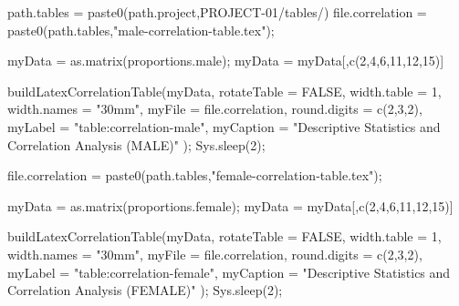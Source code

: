 \documentclass[]{article}
\newenvironment{Shaded}{\begin{snugshade}}{\end{snugshade}}
\newcommand{\AttributeTok}[1]{\textcolor[rgb]{0.77,0.63,0.00}{#1}}
\newcommand{\ConstantTok}[1]{\textcolor[rgb]{0.00,0.00,0.00}{#1}}
\newcommand{\DecValTok}[1]{\textcolor[rgb]{0.00,0.00,0.81}{#1}}
\newcommand{\FunctionTok}[1]{\textcolor[rgb]{0.00,0.00,0.00}{#1}}
\newcommand{\NormalTok}[1]{#1}
\newcommand{\OtherTok}[1]{\textcolor[rgb]{0.56,0.35,0.01}{#1}}
\newcommand{\StringTok}[1]{\textcolor[rgb]{0.31,0.60,0.02}{#1}}
\begin{document}
\begin{Shaded}
\begin{Highlighting}[]
\NormalTok{path.tables }\OtherTok{=} \FunctionTok{paste0}\NormalTok{(path.project,}\StringTok{\textquotesingle{}PROJECT{-}01/tables/\textquotesingle{}}\NormalTok{)}
\NormalTok{file.correlation }\OtherTok{=} \FunctionTok{paste0}\NormalTok{(path.tables,}\StringTok{"male{-}correlation{-}table.tex"}\NormalTok{);}

\NormalTok{myData }\OtherTok{=} \FunctionTok{as.matrix}\NormalTok{(proportions.male);}
\NormalTok{myData }\OtherTok{=}\NormalTok{ myData[,}\FunctionTok{c}\NormalTok{(}\DecValTok{2}\NormalTok{,}\DecValTok{4}\NormalTok{,}\DecValTok{6}\NormalTok{,}\DecValTok{11}\NormalTok{,}\DecValTok{12}\NormalTok{,}\DecValTok{15}\NormalTok{)]}

\FunctionTok{buildLatexCorrelationTable}\NormalTok{(myData, }
  \AttributeTok{rotateTable =} \ConstantTok{FALSE}\NormalTok{,}
  \AttributeTok{width.table =} \DecValTok{1}\NormalTok{,}
  \AttributeTok{width.names =} \StringTok{"30mm"}\NormalTok{,}
  \AttributeTok{myFile =}\NormalTok{ file.correlation,}
  \AttributeTok{round.digits =} \FunctionTok{c}\NormalTok{(}\DecValTok{2}\NormalTok{,}\DecValTok{3}\NormalTok{,}\DecValTok{2}\NormalTok{),}
  \AttributeTok{myLabel =} \StringTok{"table:correlation{-}male"}\NormalTok{,}
  \AttributeTok{myCaption =} \StringTok{"Descriptive Statistics and Correlation Analysis (MALE)"}
\NormalTok{  );}
\FunctionTok{Sys.sleep}\NormalTok{(}\DecValTok{2}\NormalTok{);}

\NormalTok{file.correlation }\OtherTok{=} \FunctionTok{paste0}\NormalTok{(path.tables,}\StringTok{"female{-}correlation{-}table.tex"}\NormalTok{);}

\NormalTok{myData }\OtherTok{=} \FunctionTok{as.matrix}\NormalTok{(proportions.female);}
\NormalTok{myData }\OtherTok{=}\NormalTok{ myData[,}\FunctionTok{c}\NormalTok{(}\DecValTok{2}\NormalTok{,}\DecValTok{4}\NormalTok{,}\DecValTok{6}\NormalTok{,}\DecValTok{11}\NormalTok{,}\DecValTok{12}\NormalTok{,}\DecValTok{15}\NormalTok{)]}

\FunctionTok{buildLatexCorrelationTable}\NormalTok{(myData, }
  \AttributeTok{rotateTable =} \ConstantTok{FALSE}\NormalTok{,}
  \AttributeTok{width.table =} \DecValTok{1}\NormalTok{,}
  \AttributeTok{width.names =} \StringTok{"30mm"}\NormalTok{,}
  \AttributeTok{myFile =}\NormalTok{ file.correlation,}
  \AttributeTok{round.digits =} \FunctionTok{c}\NormalTok{(}\DecValTok{2}\NormalTok{,}\DecValTok{3}\NormalTok{,}\DecValTok{2}\NormalTok{),}
  \AttributeTok{myLabel =} \StringTok{"table:correlation{-}female"}\NormalTok{,}
  \AttributeTok{myCaption =} \StringTok{"Descriptive Statistics and Correlation Analysis (FEMALE)"}
\NormalTok{  );}
\FunctionTok{Sys.sleep}\NormalTok{(}\DecValTok{2}\NormalTok{);}
\end{Highlighting}
\end{Shaded}
\end{document}
